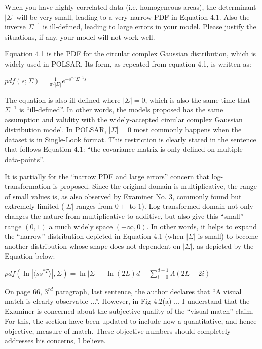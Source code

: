 \replyToComment
    {When you have highly correlated data (i.e. homogeneous areas), the determinant $|\Sigma|$ will be very small, leading to a very narrow PDF in Equation 4.1.
Also the inverse $\Sigma^{-1}$ is ill-defined, leading to large errors in your model.
Please justify the situations, if any, your model will not work well.}
    {Equation 4.1 is the PDF for the circular complex Gaussian distribution, which is widely used in POLSAR.
Its form, as repeated from equation 4.1, is written as:

\begin{center}
  $pdf(s;\Sigma)=\frac{1}{\pi^d |\Sigma|} e^{-s^{*T}\Sigma^{-1}s}$
\end{center}

The equation is also ill-defined where $|\Sigma|=0$, which is also the same time that $\Sigma^{-1}$ is ``ill-defined''.
In other words, the models proposed has the same assumption and validity with the widely-accepted circular complex Gaussian distribution model.
In POLSAR, $|\Sigma|=0$ most commonly happens when the dataset is in Single-Look format.
This restriction is clearly stated in the sentence that follows Equation 4.1: ``the covariance matrix is only defined on multiple data-points''.

It is partially for the ``narrow PDF and large errors'' concern that log-transformation is proposed.
Since the original domain is multiplicative, the range of small values is, as also observed by Examiner No. 3, commonly found but extremely limited ($|\Sigma|$ ranges from $0+$ to $1$).
Log transformed domain not only changes the nature from multiplicative to additive, but also give this ``small'' range $(0,1)$ a much widely space $(-\infty,0)$.
In other words, it helps to expand the ``narrow'' distribution depicted in Equation 4.1 (when $|\Sigma|$ is small) to become another distribution whose shape does not dependent on $|\Sigma|$, as depicted by the Equation below:

\begin{center}
  $pdf( \ln | \langle ss^{*T} \rangle|, \Sigma) = \ln |\Sigma| - \ln(2L)d + \sum^{d-1}_{i=0} \Lambda (2L-2i)$
\end{center}
}

\replyToComment
    {On page 66, $3^{rd}$ paragraph, last sentence, the author declares that ``A visual match is clearly observable ...''.
However, in Fig 4.2(a) ...}
    {I understand that the Examiner is concerned about the subjective quality of the ``visual match'' claim. 
For this, the section have been updated to include now a quantitative, and hence objective, measure of match.
These objective numbers should completely addresses his concerns, I believe.}


